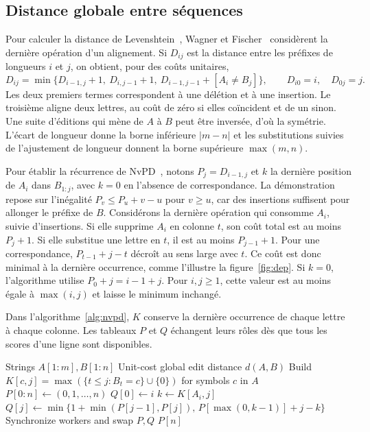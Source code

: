 \subsection{Distance globale entre séquences}
Pour calculer la distance de Levenshtein~\cite{levenshtein}, Wagner et Fischer~\cite{wagner} considèrent la dernière opération d’un alignement. Si \(D_{ij}\) est la distance entre les préfixes de longueurs \(i\) et \(j\), on obtient, pour des coûts unitaires,
\[
 D_{ij}=\min\{D_{i-1,j}+1,\ D_{i,j-1}+1,\ D_{i-1,j-1}+[A_i\ne B_j]\},
 \qquad D_{i0}=i,\quad D_{0j}=j.
\]
Les deux premiers termes correspondent à une délétion et à une insertion. Le troisième aligne deux lettres, au coût de zéro si elles coïncident et de un sinon. Une suite d'éditions qui mène de \(A\) à \(B\) peut être inversée, d'où la symétrie. L'écart de longueur donne la borne inférieure \(\lvert m-n\rvert\) et les substitutions suivies de l'ajustement de longueur donnent la borne supérieure \(\max(m,n)\).

Pour établir la récurrence de NvPD~\cite{sadiq}, notons \(P_j=D_{i-1,j}\) et \(k\) la dernière position de \(A_i\) dans \(B_{1:j}\), avec \(k=0\) en l’absence de correspondance. La démonstration repose sur l’inégalité \(P_v\le P_u+v-u\) pour \(v\ge u\), car des insertions suffisent pour allonger le préfixe de \(B\). Considérons la dernière opération qui consomme \(A_i\), suivie d'insertions. Si elle supprime \(A_i\) en colonne \(t\), son coût total est au moins \(P_j+1\). Si elle substitue une lettre en \(t\), il est au moins \(P_{j-1}+1\). Pour une correspondance, \(P_{t-1}+j-t\) décroît au sens large avec \(t\). Ce coût est donc minimal à la dernière occurrence, comme l’illustre la figure~\ref{fig:dep}. Si \(k=0\), l’algorithme utilise \(P_0+j=i-1+j\). Pour \(i,j\ge1\), cette valeur est au moins égale à \(\max(i,j)\) et laisse le minimum inchangé.

Dans l’algorithme~\ref{alg:nvpd}, \(K\) conserve la dernière occurrence de chaque lettre à chaque colonne. Les tableaux \(P\) et \(Q\) échangent leurs rôles dès que tous les scores d’une ligne sont disponibles.
\begin{algorithm}[!htbp]
\caption{Mise à jour de NvPD par colonnes indépendantes}\label{alg:nvpd}
\begin{algorithmic}[1]
\Require Strings \(A[1:m], B[1:n]\)
\Ensure Unit-cost global edit distance \(d(A,B)\)
\State Build \(K[c,j]=\max(\{t\le j:B_t=c\}\cup\{0\})\) for symbols \(c\) in \(A\)
\State \(P[0:n]\gets (0,1,\ldots,n)\)
  \State \(Q[0]\gets i\)
    \State \(k\gets K[A_i,j]\)
    \State \(Q[j]\gets\min\{1+\min(P[j-1],P[j]),\,P[\max(0,k-1)]+j-k\}\)
  \EndFor
  \State Synchronize workers and swap \(P,Q\)
\EndFor
\State \Return \(P[n]\)
\end{algorithmic}
\end{algorithm}

